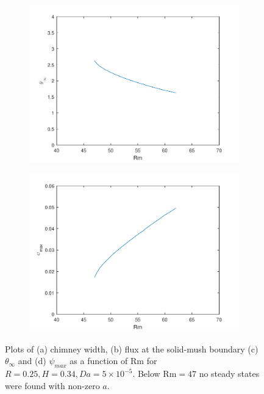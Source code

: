 \documentclass[11pt]{proc}
\begin{document}
\begin{figure}[ht!]
\begin{subfigure}[t]{.48\linewidth}
    \includegraphics[width=\textwidth]{Rm-theta-inf-H0-25R0-34}
    \caption{}
    \label{fig:steady-state-Rm-theta-inf}
 \end{subfigure}
  \quad
 \begin{subfigure}[t]{.48\linewidth}
    \centering
    \includegraphics[width=\textwidth]{Rm-psi-H0-25R0-34}
    \caption{}
    \label{fig:steady-state-Rm-psi}
 \end{subfigure}
 
 \caption{Plots of (a) chimney width, (b) flux at the solid-mush boundary (c) $\theta_\infty$ and (d) $\psi_{max}$ as a function of Rm for $R=0.25, H=0.34, Da=5\times10^{-5}$. Below $\text{Rm} = 47$ no steady states were found with non-zero $a$.}
 \label{fig:parameter-plots}
 \end{figure}
\end{document}
